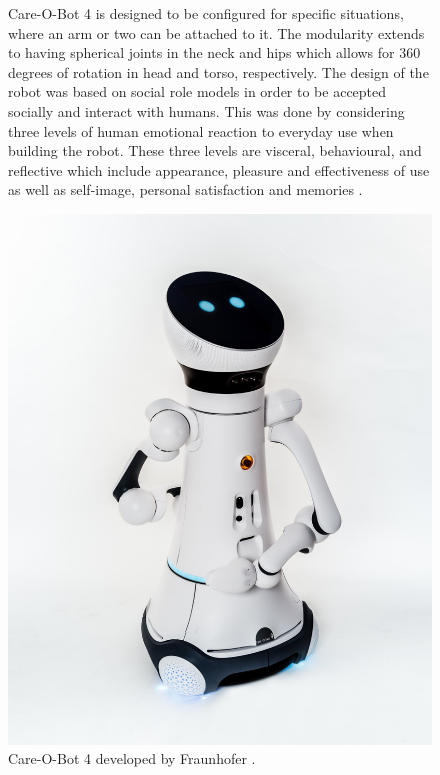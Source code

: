 \begin{figure}[H]
    \centering
    \begin{minipage}[b]{0.52\linewidth}
        Care-O-Bot 4 is designed to be configured for specific situations, where an arm or two can be attached to it. The modularity extends to having spherical joints in the neck and hips which allows for 360 degrees of rotation in head and torso, respectively. The design of the robot was based on social role models in order to be accepted socially and interact with humans. This was done by considering three levels of human emotional reaction to everyday use when building the robot. These three levels are visceral, behavioural, and reflective which include appearance, pleasure and effectiveness of use as well as self-image, personal satisfaction and memories \cite{cob4}.
    \end{minipage}
    \hspace{0.42cm}
    \begin{minipage}[b]{0.43\linewidth}
        \centering
        \includegraphics[width=\textwidth]{figures/Cob4.jpg}
        \caption{Care-O-Bot 4 developed by Fraunhofer \cite{cob4_image}.}
        \label{fig:cob4}
    \end{minipage}
\end{figure}

